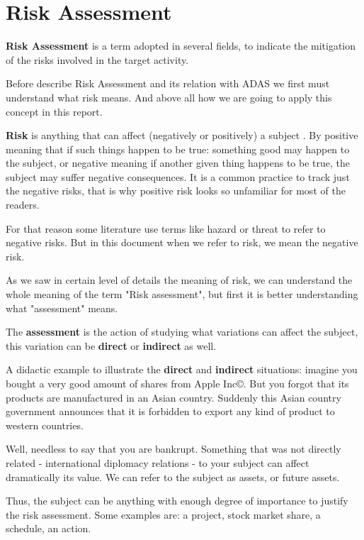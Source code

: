 
\section{Risk Assessment}
\label{sec:riskassessment}

\textbf{Risk Assessment} is a term adopted in several fields, to indicate the mitigation of the risks involved in the target activity. 

Before describe Risk Assessment and its relation with ADAS we first must understand what risk means. And above all how we are going to apply this concept in this report. 

\textbf{Risk} is anything that can affect (negatively or positively) a subject \cite{mulcahy2011pmp}. By positive meaning that if such things happen to be true: something good may happen to the subject, or negative meaning if another given thing happens to be true, the subject may suffer negative consequences. It is a common practice to track just the negative risks, that is why positive risk looks so unfamiliar for most of the readers. 

For that reason some literature use terms like hazard or threat to refer to negative risks. But in this document when we refer to risk, we mean the negative risk.

As we saw in certain level of details the meaning of risk, we can understand the whole meaning of the term "Risk assessment", but first it is better understanding what "assessment" means.

The \textbf{assessment} is the action of studying what variations can affect the subject, this variation can be \textbf{direct} or \textbf{indirect} as well.

A didactic example to illustrate the \textbf{direct} and \textbf{indirect} situations: imagine you bought a very good amount of shares from Apple Inc\copyright. But you forgot that its products are manufactured in an Asian country. Suddenly this Asian country government announces that it is forbidden to export any kind of product to western countries. 

Well, needless to say that you are bankrupt. Something that was not directly related - international diplomacy relations - to your subject can affect dramatically its value. We can refer to the subject as assets, or future assets.

Thus, the subject can be anything with enough degree of importance to justify the risk assessment. Some examples are: a project, stock market share, a schedule, an action.

